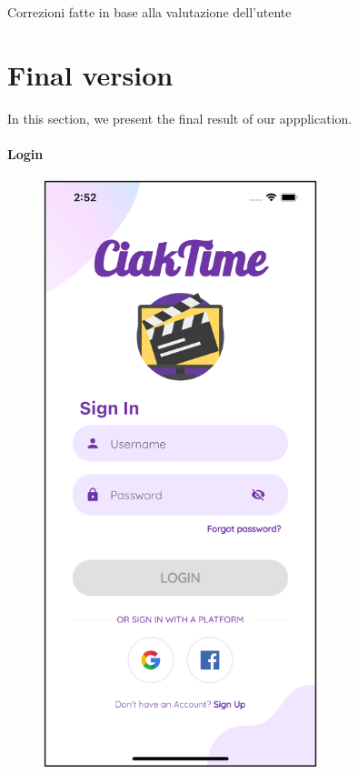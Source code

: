 \documentclass[12pt, a4paper]{article}
\numberwithin{figure}{section}
\begin{document}
Correzioni fatte in base alla valutazione dell'utente


\newpage

\section{Final version}

In this section, we present the final result of our appplication.

\paragraph{Login}

\begin{center}
	\begin{minipage}[t]{0.31\textwidth}
		\begin{figure}[H]
			\centering
			\includegraphics[width=0.71\textwidth]{images/prototype2/login.png}\\

\end{figure}
\end{minipage}
\end{center}
\end{document}

